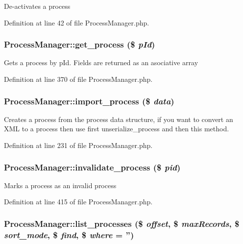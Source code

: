 De-activates a process 

Definition at line 42 of file Process\-Manager.php.
\subsubsection{\setlength{\rightskip}{0pt plus 5cm}Process\-Manager::get\_\-process (\$ {\em p\-Id})}\label{classProcessManager_a8}


Gets a process by p\-Id. Fields are returned as an asociative array 

Definition at line 370 of file Process\-Manager.php.
\subsubsection{\setlength{\rightskip}{0pt plus 5cm}Process\-Manager::import\_\-process (\$ {\em data})}\label{classProcessManager_a5}


Creates a process from the process data structure, if you want to convert an XML to a process then use first unserialize\_\-process and then this method. 

Definition at line 231 of file Process\-Manager.php.
\subsubsection{\setlength{\rightskip}{0pt plus 5cm}Process\-Manager::invalidate\_\-process (\$ {\em pid})}\label{classProcessManager_a10}


Marks a process as an invalid process 

Definition at line 415 of file Process\-Manager.php.
\subsubsection{\setlength{\rightskip}{0pt plus 5cm}Process\-Manager::list\_\-processes (\$ {\em offset}, \$ {\em max\-Records}, \$ {\em sort\_\-mode}, \$ {\em find}, \$ {\em where} = '')}\label{classProcessManager_a9}


